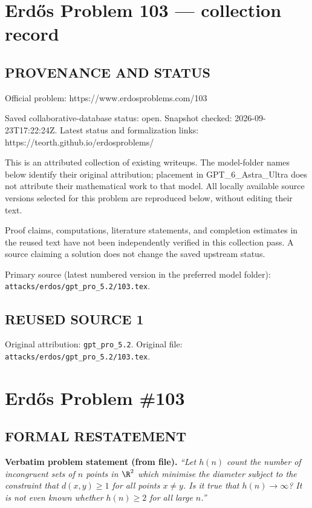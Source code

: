\section*{Erd\H{o}s Problem 103 --- collection record}

\subsection*{PROVENANCE AND STATUS}
Official problem: https://www.erdosproblems.com/103

Saved collaborative-database status: open.
Snapshot checked: 2026-09-23T17:22:24Z.
Latest status and formalization links: https://teorth.github.io/erdosproblems/

This is an attributed collection of existing writeups. The model-folder names below identify their original attribution; placement in GPT\_6\_Astra\_Ultra does not attribute their mathematical work to that model. All locally available source versions selected for this problem are reproduced below, without editing their text.

Proof claims, computations, literature statements, and completion estimates in the reused text have not been independently verified in this collection pass. A source claiming a solution does not change the saved upstream status.

Primary source (latest numbered version in the preferred model folder): \texttt{attacks/erdos/gpt\_pro\_5.2/103.tex}.

\subsection*{REUSED SOURCE 1}
Original attribution: \texttt{gpt\_pro\_5.2}.
Original file: \texttt{attacks/erdos/gpt\_pro\_5.2/103.tex}.

\section*{Erd\H{o}s Problem \#103}

\subsection*{FORMAL RESTATEMENT}
\noindent\textbf{Verbatim problem statement (from file).}
\emph{``Let $h(n)$ count the number of incongruent sets of $n$ points in $\R^2$ which minimise the diameter subject to the constraint that $d(x,y)\ge 1$ for all points $x\ne y$. Is it true that $h(n)\to\infty$? It is not even known whether $h(n)\ge 2$ for all large $n$.''}

